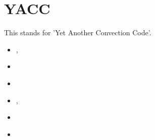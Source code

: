 


\section{YACC} 
This stands for 'Yet Another Convection Code'.

\begin{small}
\begin{itemize}
\item[\twothousandten]       \textcite{toyc10}, \textcite{kilv10}
\item[\twothousandeleven]    \textcite{yutc11}
\item[\twothousandtwelve]    \textcite{sato12}
\item[\twothousandthirteen]  \textcite{toyd13}, \textcite{pltb13}
\item[\twothousandfifteen]   \textcite{tosn15}
\item[\twothousandsixteen]   \textcite{tomy16}
\end{itemize}
\end{small}


